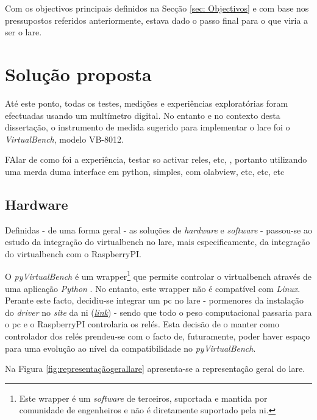 Com os objectivos principais definidos na Secção \ref{sec: Objectivos} e com base nos pressupostos referidos anteriormente, estava dado o passo final para o que viria a ser o \acrshort{lare}.

\section{Solução proposta}
\label{sec:solucaoproposta}
Até este ponto, todas os testes, medições e experiências exploratórias foram efectuadas usando um multímetro digital.
No entanto e no contexto desta dissertação, o instrumento de medida sugerido para implementar o \acrshort{lare} foi o \textit{VirtualBench}, modelo VB-8012.

FAlar de como foi a experiência, testar so activar reles, etc, , portanto utilizando uma merda duma interface em python, simples, com olabview, etc, etc, etc

\subsection{Hardware}
Definidas - de uma forma geral - as soluções de \textit{hardware} e \textit{software} - passou-se ao estudo da integração do \acrshort{virtualbench} no \acrshort{lare}, mais especificamente, da integração do \acrshort{virtualbench} com o \gls{RaspberryPI}.

O \textit{pyVirtualBench} é um \gls{wrapper}\footnote{Este \gls{wrapper} é um \textit{software} de terceiros, suportada e mantida por comunidade de engenheiros e não é diretamente suportado pela \acrshort{ni}.} que permite controlar o \acrshort{virtualbench} através de uma aplicação \textit{Python} \cite{pyvirtualbench}. No entanto, este \gls{wrapper} não é compatível com \textit{Linux}.
Perante este facto, decidiu-se integrar um \acrshort{pc} no \acrshort{lare} - pormenores da instalação do \textit{driver} no \textit{site} da \acrshort{ni} (\href{https://knowledge.ni.com/KnowledgeArticleDetails?id=kA00Z000000kHUFSA2&l=pt-PT}{\textit{link}}) - sendo que todo o peso computacional passaria para o \acrshort{pc} e o \gls{RaspberryPI} controlaria os relés. Esta decisão de o manter como controlador dos relés prendeu-se com o facto de, futuramente, poder haver espaço para uma evolução ao nível da compatibilidade no \textit{pyVirtualBench}.

Na Figura \ref{fig:representaçãogerallare} apresenta-se a representação geral do \acrshort{lare}.

